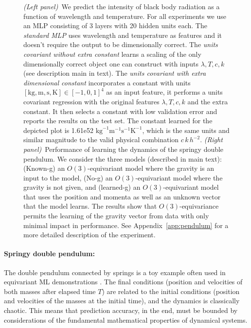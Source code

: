 \documentclass[preprint]{article} %
\newcommand{\appref}[1]{Appendix~\ref{#1}}
\newcommand{\unit}[1]{\mathrm{#1}}
\newcommand{\kg}{\unit{kg}}
\newcommand{\m}{\unit{m}}
\newcommand{\s}{\unit{s}}
\newcommand{\K}{\unit{K}}
\begin{document}
\begin{figure}[t!]
    \caption{\textsl{(Left panel)}~We predict the intensity of black body radiation as a function of wavelength and temperature. For all experiments we use an MLP consisting of 3 layers with 20 hidden units each. The \emph{standard MLP} uses wavelength and temperature as features and it doesn't require the output to be dimensionally correct. The \emph{units covariant without extra constant} learns a scaling of the only dimensionally correct object one can construct with inputs $\lambda, T, c, k$ (see description main in text). The \emph{units covariant with extra dimensional constant} incorporates a constant with units $[\kg, \m, \s, \K]\in[-1,0,1]^4$ as an input feature, it performs a units covariant regression with the original features $\lambda, T, c, k$ and the extra constant. It then selects a constant with low validation error and reports the results on the test set. The constant learned for the depicted plot is 1.61e52 $\kg^{-1}\m^{-1}\s^{-1}\K^{-1}$, which is the same units and similar magnitude to the valid physical combination $c\,k\,h^{-2}$.
    \textsl{(Right panel)}~Performance of learning the dynamics of the springy double pendulum. We consider the three models (described in main text): (Known-g) an $O(3)$-equivariant model where the gravity is an input to the model, (No-g) an $O(3)$-equivariant model where the gravity is not given, and (learned-g) an $O(3)$-equivariant model that uses the position and momenta as well as an unknown vector that the model learns. The results show that $O(3)$-equivariance permits the learning of the gravity vector from data with only minimal impact in performance. See \appref{app:pendulum} for a more detailed description of the experiment.}
    \label{fig:exps}
\end{figure}

\paragraph{Springy double pendulum:}
The double pendulum connected by springs is a toy example often used in equivariant ML demonstrations \citep{finzi2021practical,yao2021simple, villar2022dimensionless}. 
The final conditions (position and velocities of both masses after elapsed time $T$) are related to the initial conditions (position and velocities of the masses at the initial time), and the dynamics is classically chaotic.
This means that prediction accuracy, in the end, must be bounded by considerations of the fundamental mathematical properties of dynamical systems.
\end{document}
